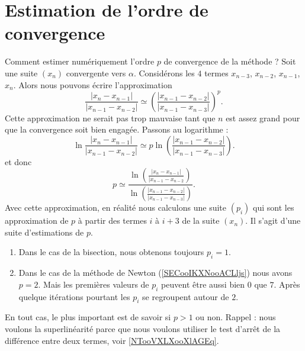 \section{Estimation de l'ordre de convergence}

Comment estimer numériquement l'ordre \( p\) de convergence de la méthode ? Soit une suite \( (x_n)\) convergente vers \( \alpha\). Considérons les \( 4\) termes \( x_{n-3}\), \( x_{n-2}\), \( x_{n-1}\), \( x_n\). Alors nous pouvons écrire l'approximation
\begin{equation}
    \frac{ | x_n -x_{n-1}| }{ | x_{n-1}-x_{n-2} | }\simeq \left( \frac{ | x_{n-1}-x_{n-2} | }{ | x_{n-1}-x_{n-3} | } \right)^p.
\end{equation}
Cette approximation ne serait pas trop mauvaise tant que \( n\) est assez grand pour que la convergence soit bien engagée. Passons au logarithme :
\begin{equation}
    \ln \frac{ | x_n -x_{n-1}| }{ | x_{n-1}-x_{n-2} | }\simeq p\ln \left( \frac{ | x_{n-1}-x_{n-2} | }{ | x_{n-1}-x_{n-3} | } \right).
\end{equation}
et donc
\begin{equation}
    p\simeq \frac{ \ln\left( \frac{ | x_n -x_{n-1}| }{ | x_{n-1}-x_{n-2} } \right) }{ \ln \left(\frac{ | x_{n-1}-x_{n-2} | }{ | x_{n-1}-x_{n-3} | } \right)}.
\end{equation}
Avec cette approximation, en réalité nous calculons une suite \( (p_i)\) qui sont les approximation de \( p\) à partir des termes \( i\) à \(i+3 \) de la suite \( (x_n)\). Il s'agit d'une suite d'estimations de \( p\).

\begin{enumerate}
    \item
Dans le cas de la bisection, nous obtenons toujours \( p_i=1\).
\item
    Dans le cas de la méthode de Newton (\ref{SECooIKXNooACLljs}) nous avons \( p=2\). Mais les premières valeurs de \( p_i\) peuvent être aussi bien \( 0\) que \( 7\). Après quelque itérations pourtant les \( p_i\) se regroupent autour de \( 2\).
\end{enumerate}
En tout cas, le plus important est de savoir si \( p>1\) ou non. Rappel : nous voulons la superlinéarité parce que nous voulons utiliser le test d'arrêt de la différence entre deux termes, voir \ref{NTooVXLXooXlAGEq}. 

